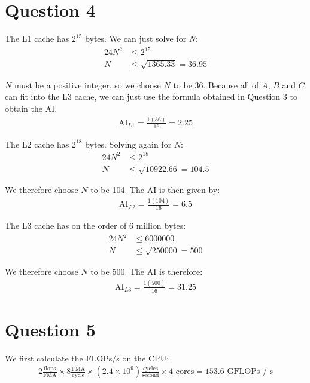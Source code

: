 \documentclass[11pt]{article}
\begin{document}
    \section*{Question 4}
        The L1 cache has $2^{15}$ bytes. We can just solve for $N$:
        \begin{align*}
            24N^2 &\leq 2^{15}\\
            N &\leq \sqrt{1365.33} = 36.95
        \end{align*}

        $N$ must be a positive integer, so we choose $N$ to be 36. Because all of $A$, $B$ and $C$ can fit into the L3 cache, we can just use the formula obtained in Question 3 to obtain the AI. 
        \begin{align*}
            \text{AI}_{L1} = \frac{1(36)}{16} = 2.25
        \end{align*}

        The L2 cache has $2^{18}$ bytes. Solving again for $N$:
        \begin{align*}
            24N^2 &\leq 2^{18}\\
            N &\leq \sqrt{10922.66} = 104.5
        \end{align*}

        We therefore choose $N$ to be 104. The AI is then given by:
        \begin{align*}
            \text{AI}_{L2} = \frac{1(104)}{16} = 6.5
        \end{align*}

        The L3 cache has on the order of 6 million bytes:
        \begin{align*}
            24N^2 &\leq 6000000\\
            N &\leq \sqrt{250000} = 500
        \end{align*}

        We therefore choose $N$ to be 500. The AI is therefore:
        \begin{align*}
            \text{AI}_{L3} = \frac{1(500)}{16} = 31.25
        \end{align*}

    \section*{Question 5}
        We first calculate the FLOPs/s on the CPU:
        \begin{align*}
            2 \frac{\text{flops}}{\text{FMA}} \times 8 \frac{\text{FMA}}{\text{cycle}}\times (2.4\times 10^9)\frac{\text{cycles}}{\text{second}} \times 4\text{ cores} = 153.6 \text{ GFLOPs / s}
        \end{align*}
        
\end{document}
